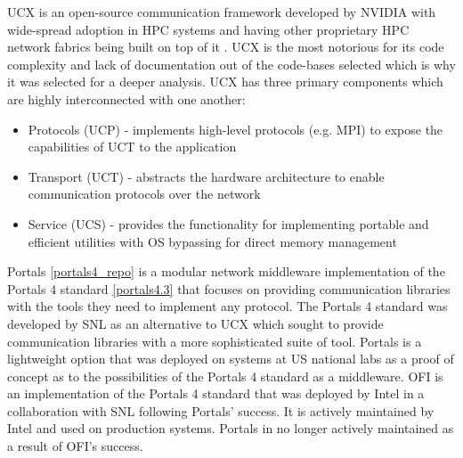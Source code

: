 UCX \cite{ucx_github} is an open-source communication framework developed by NVIDIA with wide-spread adoption in HPC systems and having other proprietary HPC network fabrics being built on top of it \cite{openfabrics_libfabric}. UCX is the most notorious for its code complexity and lack of documentation out of the code-bases selected which is why it was selected for a deeper analysis. UCX has three primary components which are highly interconnected with one another:
\begin{itemize}
    \item Protocols (UCP) - implements high-level protocols (e.g. MPI) to expose the capabilities of UCT to the application
    \item Transport (UCT) - abstracts the hardware architecture to enable communication protocols over the network
    \item Service (UCS) - provides the functionality for implementing portable and efficient utilities with OS bypassing for direct memory management
\end{itemize}

Portals \ref{portals4_repo} is a modular network middleware implementation of the Portals 4 standard \ref{portals4.3} that focuses on providing communication libraries with the tools they need to implement any protocol. The Portals 4 standard was developed by SNL as an alternative to UCX which sought to provide communication libraries with a more sophisticated suite of tool. Portals is a lightweight option that was deployed on systems at US national labs as a proof of concept as to the possibilities of the Portals 4 standard as a middleware. OFI \cite{libfabric_repo} is an implementation of the Portals 4 standard that was deployed by Intel in a collaboration with SNL following Portals' success. It is actively maintained by Intel and used on production systems. Portals in no longer actively maintained as a result of OFI's success.

